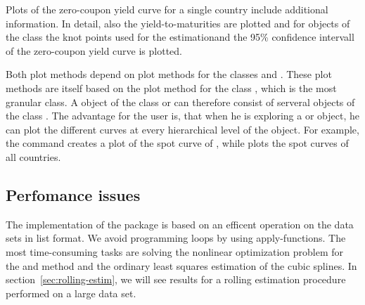 Plots of the zero-coupon yield curve for a single country include additional information. In detail, 
also the yield-to-maturities are plotted and for objects of the class  the knot points used for the estimationand the 95\% confidence intervall of the zero-coupon yield curve is plotted. 

Both plot methods depend on plot methods for the classes  and . These plot methods are itself based on the plot method for the class , which is the most granular class.
A object of the class  or  can therefore consist of serveral 
objects of the class . The advantage for the user is, that when he
is exploring a  or  object, he can plot the different curves at every hierarchical level of the object. For example, the command  creates a plot of the spot curve of , while  plots the spot curves of all countries. 


\subsection{Perfomance issues}
\label{sec:perfomance-issues}

The implementation of the  package is based on an efficent operation on the data sets in list format. We avoid programming loops by using apply-functions. The most time-consuming tasks are solving the nonlinear optimization problem for the \cite{Nelson1987} and \cite{Svensson1994} method and the ordinary least squares estimation of the \cite{McCulloch1975} cubic splines. In section~\ref{sec:rolling-estim}, we will see results for a rolling estimation procedure performed on a large data set.


